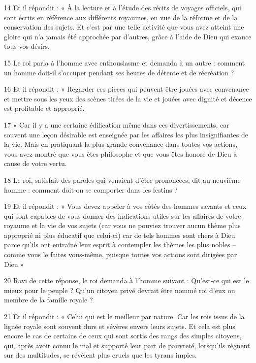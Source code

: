 \par 14 Et il répondit : « À la lecture et à l'étude des récits de voyages officiels, qui sont écrits en référence aux différents royaumes, en vue de la réforme et de la conservation des sujets. Et c'est par une telle activité que vous avez atteint une gloire qui n'a jamais été approchée par d'autres, grâce à l'aide de Dieu qui exauce tous vos désirs.

\par 15 Le roi parla à l'homme avec enthousiasme et demanda à un autre : comment un homme doit-il s'occuper pendant ses heures de détente et de récréation ?

\par 16 Et il répondit : « Regarder ces pièces qui peuvent être jouées avec convenance et mettre sous les yeux des scènes tirées de la vie et jouées avec dignité et décence est profitable et approprié.

\par 17 « Car il y a une certaine édification même dans ces divertissements, car souvent une leçon désirable est enseignée par les affaires les plus insignifiantes de la vie. Mais en pratiquant la plus grande convenance dans toutes vos actions, vous avez montré que vous êtes philosophe et que vous êtes honoré de Dieu à cause de votre vertu.

\par 18 Le roi, satisfait des paroles qui venaient d'être prononcées, dit au neuvième homme : comment doit-on se comporter dans les festins ?

\par 19 Et il répondit : « Vous devez appeler à vos côtés des hommes savants et ceux qui sont capables de vous donner des indications utiles sur les affaires de votre royaume et la vie de vos sujets (car vous ne pouviez trouver aucun thème plus approprié ni plus éducatif que celui-ci) car de tels hommes sont chers à Dieu parce qu’ils ont entraîné leur esprit à contempler les thèmes les plus nobles – comme vous le faites vous-même, puisque toutes vos actions sont dirigées par Dieu.»

\par 20 Ravi de cette réponse, le roi demanda à l'homme suivant : Qu'est-ce qui est le mieux pour le peuple ? Qu'un citoyen privé devrait être nommé roi d'eux ou membre de la famille royale ?

\par 21 Et il répondit : « Celui qui est le meilleur par nature. Car les rois issus de la lignée royale sont souvent durs et sévères envers leurs sujets. Et cela est plus encore le cas de certains de ceux qui sont sortis des rangs des simples citoyens, qui, après avoir connu le mal et supporté leur part de pauvreté, lorsqu'ils règnent sur des multitudes, se révèlent plus cruels que les tyrans impies.

